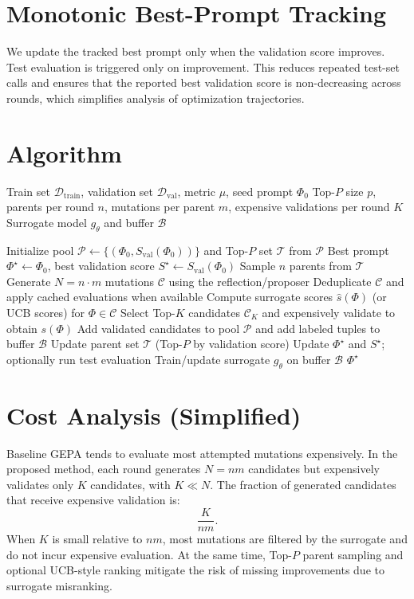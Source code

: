 \section{Monotonic Best-Prompt Tracking}
We update the tracked best prompt only when the validation score improves. Test evaluation is triggered only on improvement. This reduces repeated test-set calls and ensures that the reported best validation score is non-decreasing across rounds, which simplifies analysis of optimization trajectories.

\section{Algorithm}
\begin{algorithm}[H]
\caption{Surrogate-Guided Prompt Optimization (SGPO)}
\label{alg:bandit_gepa}
\begin{algorithmic}[1]
\Require Train set $\mathcal{D}_{\text{train}}$, validation set $\mathcal{D}_{\text{val}}$, metric $\mu$, seed prompt $\Phi_0$
\Require Top-$P$ size $p$, parents per round $n$, mutations per parent $m$, expensive validations per round $K$
\Require Surrogate model $g_\theta$ and buffer $\mathcal{B}$

\State Initialize pool $\mathcal{P}\leftarrow\{(\Phi_0,S_{\text{val}}(\Phi_0))\}$ and Top-$P$ set $\mathcal{T}$ from $\mathcal{P}$
\State Best prompt $\Phi^\star \leftarrow \Phi_0$, best validation score $S^\star \leftarrow S_{\text{val}}(\Phi_0)$
    \State Sample $n$ parents from $\mathcal{T}$
    \State Generate $N=n\cdot m$ mutations $\mathcal{C}$ using the reflection/proposer
    \State Deduplicate $\mathcal{C}$ and apply cached evaluations when available
    \State Compute surrogate scores $\widehat{s}(\Phi)$ (or UCB scores) for $\Phi\in\mathcal{C}$
    \State Select Top-$K$ candidates $\mathcal{C}_K$ and expensively validate to obtain $s(\Phi)$
    \State Add validated candidates to pool $\mathcal{P}$ and add labeled tuples to buffer $\mathcal{B}$
    \State Update parent set $\mathcal{T}$ (Top-$P$ by validation score)
        \State Update $\Phi^\star$ and $S^\star$; optionally run test evaluation
    \EndIf
    \State Train/update surrogate $g_\theta$ on buffer $\mathcal{B}$
\EndWhile
\State \Return $\Phi^\star$
\end{algorithmic}
\end{algorithm}

\section{Cost Analysis (Simplified)}
Baseline GEPA tends to evaluate most attempted mutations expensively. In the proposed method, each round generates $N=n m$ candidates but expensively validates only $K$ candidates, with $K \ll N$. The fraction of generated candidates that receive expensive validation is:
\[
\frac{K}{nm}.
\]
When $K$ is small relative to $nm$, most mutations are filtered by the surrogate and do not incur expensive evaluation. At the same time, Top-$P$ parent sampling and optional UCB-style ranking mitigate the risk of missing improvements due to surrogate misranking.

